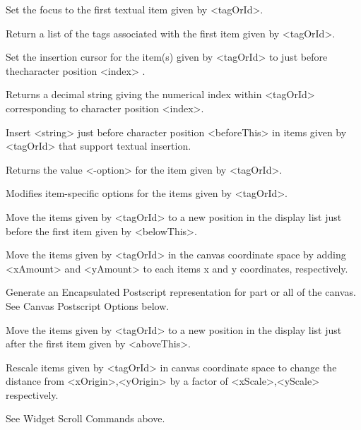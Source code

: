 \begin{enum}{1cm}
Set the focus to the first textual item given by <tagOrId>.

Return a list of the tags associated with the first item given by <tagOrId>.

Set the insertion cursor for the item(s) given by <tagOrId> to just 
before thecharacter  position <index> .

Returns a decimal  string  giving  the numerical  index  within  <tagOrId>
corresponding to character position <index>.

Insert <string> just before character position <beforeThis> in items
given by <tagOrId> that support textual insertion.

Returns the value <-option> for the item given by <tagOrId>.

Modifies  item-specific options for the items given by <tagOrId>.

Move the items given by <tagOrId> to a new position in the
display list just before the first item given by <belowThis>.

Move the items given by <tagOrId> in the canvas coordinate space by
adding <xAmount> and <yAmount> to each items x and y coordinates, respectively.

Generate an Encapsulated Postscript representation  for  part  or all  of  the canvas.
See Canvas Postscript Options below.

Move the items given by <tagOrId> to a new position in the
display list just after the first item given by <aboveThis>.

Rescale items given by <tagOrId> in canvas coordinate space to change  the
distance from <xOrigin>,<yOrigin> by a factor of <xScale>,<yScale> respectively.

See Widget Scroll Commands above.


\end{enum}

